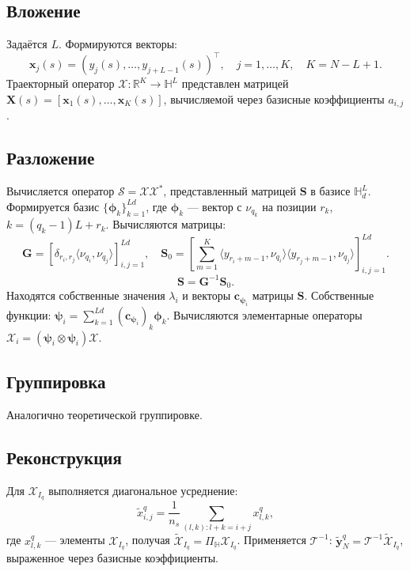 \documentclass[12pt, specialist, subf
]{disser}
\theoremstyle{definition}
\begin{document}
\subsection*{Вложение}
Задаётся \( L\). Формируются векторы:
\[
	\mathbf{x}_j(s) = (y_j(s), \dots, y_{j+L-1}(s))^\top, \quad j=1,\dots,K, \quad K=N-L+1.
\]
Траекторный оператор \( \mathcal{X}: \mathbb{R}^K \to \mathbb{H}^L \) представлен матрицей \( \mathbf{X}(s) = [\mathbf{x}_1(s), \dots, \mathbf{x}_K(s)] \), вычисляемой через базисные коэффициенты \( a_{i,j} \).

\subsection*{Разложение}

Вычисляется оператор \( \mathcal{S} = \mathcal{X} \mathcal{X}^* \), представленный матрицей \( \mathbf{S} \) в базисе \( \mathbb{H}_d^L \). Формируется базис \( \{\mathbf{\phi}_k\}_{k=1}^{Ld} \), где \( \mathbf{\phi}_k \) — вектор с \( \nu_{q_k} \) на позиции \( r_k \), \( k = (q_k-1)L + r_k \). Вычисляются матрицы:
\[
	\mathbf{G} = [\delta_{r_i,r_j} \langle \nu_{q_i}, \nu_{q_j} \rangle]_{i,j=1}^{Ld}, \quad \mathbf{S}_0 = \left[\sum_{m=1}^K \langle y_{r_i+m-1}, \nu_{q_i} \rangle \langle y_{r_j+m-1}, \nu_{q_j} \rangle\right]_{i,j=1}^{Ld}.
\]
\[
	\mathbf{S} = \mathbf{G}^{-1} \mathbf{S}_0.
\]
Находятся собственные значения \( \lambda_i \) и векторы \( \mathbf{c}_{\mathbf{\psi}_i} \) матрицы \( \mathbf{S} \). Собственные функции: \( \mathbf{\psi}_i = \sum_{k=1}^{Ld} (\mathbf{c}_{\mathbf{\psi}_i})_k \mathbf{\phi}_k \). Вычисляются элементарные операторы \( \mathcal{X}_i = (\mathbf{\psi}_i \otimes \mathbf{\psi}_i) \mathcal{X} \).

\subsection*{Группировка}
Аналогично теоретической группировке.

\subsection*{Реконструкция}
Для \( \mathcal{X}_{I_q} \) выполняется диагональное усреднение:
\[
	\tilde{x}_{i,j}^q = \frac{1}{n_s} \sum_{(l,k): l+k=i+j} x_{l,k}^q,
\]
где \( x_{l,k}^q \) — элементы \( \mathcal{X}_{I_q} \), получая \( \tilde{\mathcal{X}}_{I_q} = \Pi_\mathbb{H} \mathcal{X}_{I_q} \). Применяется \( \mathcal{T}^{-1} \): \( \tilde{\mathbf{y}}_N^q = \mathcal{T}^{-1} \tilde{\mathcal{X}}_{I_q} \), выраженное через базисные коэффициенты.
\end{document}
